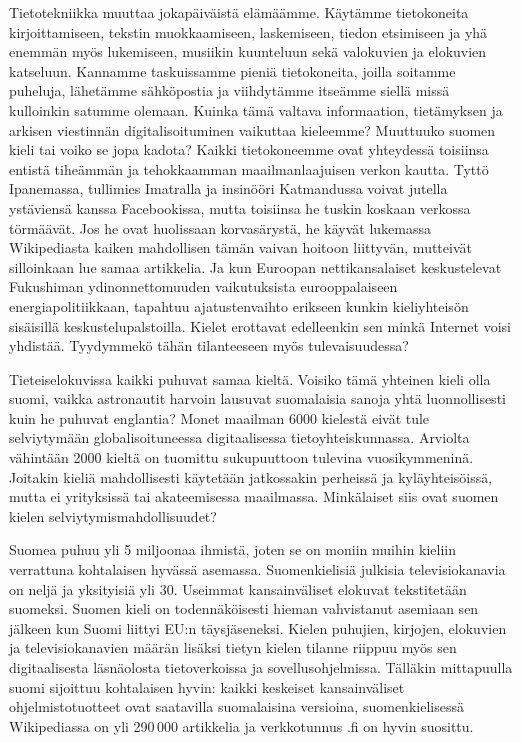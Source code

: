 \begin{multicols}{2}
Tietotekniikka muuttaa jokapäiväistä elämäämme. Käytämme tietokoneita kirjoittamiseen, tekstin muokkaamiseen, laskemiseen, tiedon etsimiseen ja yhä enemmän myös lukemiseen, musiikin kuunteluun sekä valokuvien ja elokuvien katseluun. Kannamme taskuissamme pieniä tietokoneita, joilla soitamme puheluja, lähetämme sähköpostia ja viihdytämme itseämme siellä missä kulloinkin satumme olemaan. Kuinka tämä valtava informaation, tietämyksen ja arkisen viestinnän digitalisoituminen vaikuttaa kieleemme? Muuttuuko suomen kieli tai voiko se jopa kadota?
Kaikki tietokoneemme ovat yhteydessä toisiinsa entistä tiheämmän ja tehokkaamman maailmanlaajuisen verkon kautta. Tyttö Ipanemassa, tullimies Imatralla ja insinööri Katmandussa voivat jutella ystäviensä kanssa Facebookissa, mutta toisiinsa he tuskin koskaan verkossa törmäävät. Jos he ovat huolissaan korvasärystä, he käyvät lukemassa Wikipediasta kaiken mahdollisen tämän vaivan hoitoon liittyvän, mutteivät silloinkaan lue samaa artikkelia. Ja kun Euroopan nettikansalaiset keskustelevat Fukushiman ydinonnettomuuden vaikutuksista eurooppalaiseen energiapolitiikkaan, tapahtuu ajatustenvaihto erikseen kunkin kieliyhteisön sisäisillä keskustelupalstoilla. Kielet erottavat edelleenkin sen minkä Internet voisi yhdistää. Tyydymmekö tähän tilanteeseen myös tulevaisuudessa?

Tieteiselokuvissa kaikki puhuvat samaa kieltä. Voisiko tämä yhteinen kieli olla suomi, vaikka astronautit harvoin lausuvat suomalaisia sanoja yhtä luonnollisesti kuin he puhuvat englantia? Monet maailman 6000 kielestä eivät tule selviytymään globalisoituneessa digitaalisessa tietoyhteiskunnassa. Arviolta vähintään 2000 kieltä on tuomittu sukupuuttoon tulevina vuosikymmeninä. Joitakin kieliä mahdollisesti käytetään jatkossakin perheissä ja kyläyhteisöissä, mutta ei yrityksissä tai akateemisessa maailmassa. Minkälaiset siis ovat suomen kielen selviytymismahdollisuudet?

Suomea puhuu yli 5 miljoonaa ihmistä, joten se on moniin muihin kieliin verrattuna kohtalaisen hyvässä asemassa. Suomenkielisiä julkisia televisiokanavia on neljä ja yksityisiä yli 30. Useimmat kansainväliset elokuvat tekstitetään suomeksi. Suomen kieli on todennäköisesti hieman vahvistanut asemiaan sen jälkeen kun Suomi liittyi EU:n täysjäseneksi.
Kielen puhujien, kirjojen, elokuvien ja televisiokanavien määrän lisäksi tietyn kielen tilanne riippuu myös sen digitaalisesta läsnäolosta tietoverkoissa ja sovellusohjelmissa. Tälläkin mittapuulla suomi sijoittuu kohtalaisen hyvin: kaikki keskeiset kansainväliset ohjelmistotuotteet ovat saatavilla suomalaisina versioina, suomenkielisessä Wikipediassa on yli 290\,000 artikkelia ja verkkotunnus .fi on hyvin suosittu.


\end{multicols}
